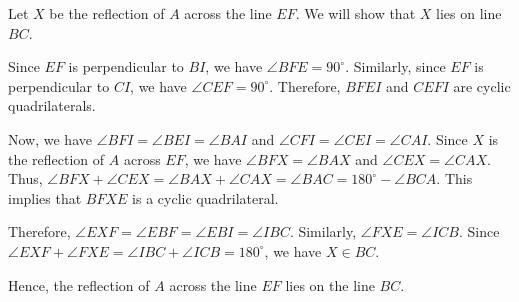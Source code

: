 Let $X$ be the reflection of $A$ across the line $EF$. We will show that $X$ lies on line $BC$.

Since $EF$ is perpendicular to $BI$, we have $\angle BFE = 90^\circ$. Similarly, since $EF$ is perpendicular to $CI$, we have $\angle CEF = 90^\circ$. Therefore, $BFEI$ and $CEFI$ are cyclic quadrilaterals.

Now, we have $\angle BFI = \angle BEI = \angle BAI$ and $\angle CFI = \angle CEI = \angle CAI$. Since $X$ is the reflection of $A$ across $EF$, we have $\angle BFX = \angle BAX$ and $\angle CEX = \angle CAX$. Thus, $\angle BFX + \angle CEX = \angle BAX + \angle CAX = \angle BAC = 180^\circ - \angle BCA$. This implies that $BFXE$ is a cyclic quadrilateral.

Therefore, $\angle EXF = \angle EBF = \angle EBI = \angle IBC$. Similarly, $\angle FXE = \angle ICB$. Since $\angle EXF + \angle FXE = \angle IBC + \angle ICB = 180^\circ$, we have $X \in BC$.

Hence, the reflection of $A$ across the line $EF$ lies on the line $BC$.
